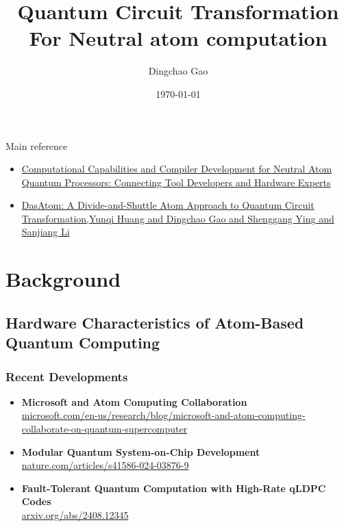 \documentclass{beamer}
\author{Dingchao Gao}
\title{Quantum Circuit Transformation For Neutral atom computation}
\institute{ISCAS}
\date{\today}
\begin{document}


\begin{frame}
    \titlepage
\end{frame}
\begin{frame}{Main reference}
    \begin{itemize}
        \item \href{https://arxiv.org/abs/2309.08656}{Computational Capabilities and Compiler Development for Neutral Atom Quantum Processors: Connecting Tool Developers and Hardware Experts}
        \item \href{https://arxiv.org/abs/2409.03185}{DasAtom: A Divide-and-Shuttle Atom Approach to Quantum Circuit Transformation,Yunqi Huang and Dingchao Gao and Shenggang Ying and Sanjiang Li}
    \end{itemize}
\end{frame}
\section{Background}

\subsection{Hardware Characteristics of Atom-Based Quantum Computing}
\begin{frame}
\frametitle{Recent Developments}

\begin{itemize}
    
    \item \textbf{Microsoft and Atom Computing Collaboration} \\
    \href{https://www.microsoft.com/en-us/research/blog/microsoft-and-atom-computing-collaborate-on-quantum-supercomputer}{\footnotesize{microsoft.com/en-us/research/blog/microsoft-and-atom-computing-collaborate-on-quantum-supercomputer}}
    
    \item \textbf{Modular Quantum System-on-Chip Development} \\
    \href{https://www.nature.com/articles/s41586-024-07371-7}{\footnotesize{nature.com/articles/s41586-024-03876-9}}
    
    \item \textbf{Fault-Tolerant Quantum Computation with High-Rate qLDPC Codes} \\
    \href{https://arxiv.org/abs/2408.12345}{\footnotesize{arxiv.org/abs/2408.12345}}
\end{itemize}
\end{frame}
\end{document}
